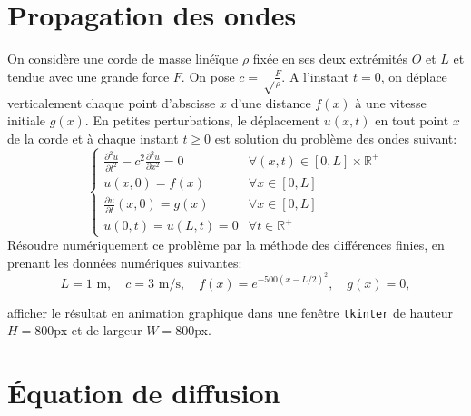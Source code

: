 \documentclass{article}
\begin{document}
\section{Propagation des ondes}
On considère une corde de masse linéïque $\rho$  fixée en ses deux extrémités $O$ et $L$ et tendue avec une grande force $F$. On pose $c=\sqrt\frac{F}{\rho}$. A l'instant $t=0$, on déplace verticalement chaque point d'abscisse $x$  d'une distance $f(x)$ à une vitesse initiale $g(x)$. En petites perturbations, le déplacement $u(x,t)$ en tout point $x$ de la corde et à chaque instant $t\geq 0$ est solution du problème des ondes suivant:
 \[\left\{\begin{array}{ll}
 \frac{\partial^2 u}{\partial t^2}-c^2 \frac{\partial^2 u}{\partial x^2}=0 & \forall (x,t)\in [0,L]\times\mathbb{R}^+\\
 u(x,0)=f(x) & \forall x \in [0,L]\\
  \frac{\partial u}{\partial t}(x,0)=g(x) & \forall x \in [0,L]\\
 u(0,t)=u(L,t)=0 & \forall t\in \mathbb{R}^+
 \end{array}\right.\]
Résoudre numériquement ce problème par la méthode des différences finies, en prenant les données numériques suivantes:
\[L=1\mbox{ m},\quad c=3\mbox{ m/s},\quad f(x)=e^{-500 (x-L/2)^2},\quad g(x)=0,\]

afficher le résultat en animation graphique dans une fenêtre {\tt tkinter} de hauteur $H=800$px et de largeur $W=800$px.
\section{Équation de diffusion}


  
\end{document}
